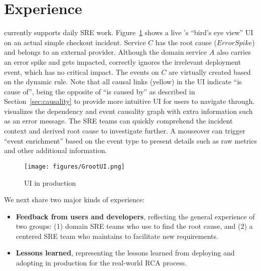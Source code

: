 \section{Experience}



\system currently supports daily SRE work. Figure~\ref{fig:UI} shows a live \system's ``bird's eye view'' UI on an actual simple checkout incident. Service $C$ has the root cause ($Error Spike$) and belongs to an external provider. Although the domain service $A$ also carries an error spike and gets impacted, \system correctly ignores the irrelevant deployment event, which has no critical impact. The events on $C$ are virtually created based on the dynamic rule. %
Note that all causal links (yellow) in the UI indicate ``is  cause of'', being the opposite of ``is caused by'' as  described in Section~\ref{sec:causality} to provide more intuitive UI  for users to navigate through. \system visualizes the dependency and event causality graph with extra information such as an error message. The SRE teams can quickly comprehend the incident context and derived root cause to investigate \system further. A mouseover can trigger ``event enrichment'' based on the event type to present details such as raw metrics and other additional information.%
\begin{figure}[t]
\centering
  \texttt{[image: figures/GrootUI.png]}
  \caption{\system UI in production}
  \label{fig:UI}
   \vspace{-3.0ex} 
\end{figure}





We next share two major kinds of experience:
\begin{itemize}
   \item \textbf{Feedback from \system users and developers},  reflecting the general experience of two groups: (1) domain SRE teams who use \system to find the root cause, and 
    (2) a centered SRE team who maintains \system to facilitate new requirements. 
   \item \textbf{Lessons learned}, representing the lessons learned from deploying and adopting \system in production for the real-world RCA process.
\end{itemize}

